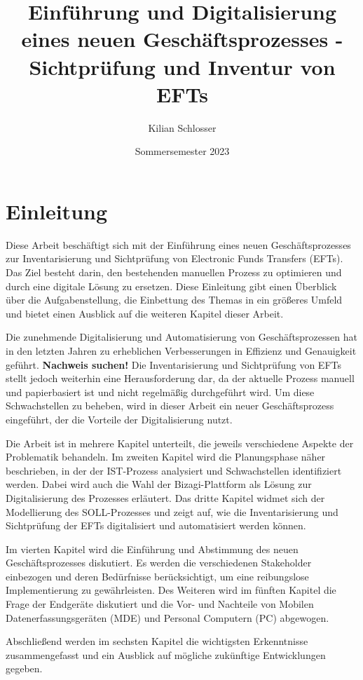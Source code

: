 \documentclass[12pt, a4paper]{article}
\title{Einführung und Digitalisierung eines neuen Geschäftsprozesses - Sichtprüfung und Inventur von EFTs}
\author{Kilian Schlosser}
\date{Sommersemester 2023}
\begin{document}
\maketitle


\tableofcontents
\newpage

\section{Einleitung}

Diese Arbeit beschäftigt sich mit der Einführung eines neuen Geschäftsprozesses zur Inventarisierung und Sichtprüfung von Electronic Funds Transfers (EFTs). 
Das Ziel besteht darin, den bestehenden manuellen Prozess zu optimieren und durch eine digitale Lösung zu ersetzen. Diese Einleitung gibt einen Überblick über die 
Aufgabenstellung, die Einbettung des Themas in ein größeres Umfeld und bietet einen Ausblick auf die weiteren Kapitel dieser Arbeit.

Die zunehmende Digitalisierung und Automatisierung von Geschäftsprozessen hat in den letzten Jahren zu erheblichen Verbesserungen in Effizienz und Genauigkeit geführt. \textbf{Nachweis suchen!}
Die Inventarisierung und Sichtprüfung von EFTs stellt jedoch weiterhin eine Herausforderung dar, da der aktuelle Prozess manuell und papierbasiert ist und nicht regelmäßig durchgeführt wird. 
Um diese Schwachstellen zu beheben, wird in dieser Arbeit ein neuer Geschäftsprozess eingeführt, der die Vorteile der Digitalisierung nutzt.

Die Arbeit ist in mehrere Kapitel unterteilt, die jeweils verschiedene Aspekte der Problematik behandeln. Im zweiten Kapitel wird die Planungsphase näher beschrieben, 
in der der IST-Prozess analysiert und Schwachstellen identifiziert werden. Dabei wird auch die Wahl der Bizagi-Plattform als Lösung zur Digitalisierung des Prozesses erläutert. 
Das dritte Kapitel widmet sich der Modellierung des SOLL-Prozesses und zeigt auf, wie die Inventarisierung und Sichtprüfung der EFTs digitalisiert und automatisiert werden 
können.

Im vierten Kapitel wird die Einführung und Abstimmung des neuen Geschäftsprozesses diskutiert. Es werden die verschiedenen Stakeholder einbezogen und deren Bedürfnisse 
berücksichtigt, um eine reibungslose Implementierung zu gewährleisten. Des Weiteren wird im fünften Kapitel die Frage der Endgeräte diskutiert und die Vor- und Nachteile 
von Mobilen Datenerfassungsgeräten (MDE) und Personal Computern (PC) abgewogen.

Abschließend werden im sechsten Kapitel die wichtigsten Erkenntnisse zusammengefasst und ein Ausblick auf mögliche zukünftige Entwicklungen gegeben.
\end{document}
